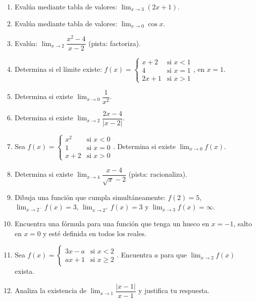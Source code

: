 \documentclass[12pt, letterpaper]{article}
\begin{document}
\begin{enumerate}[series=ejercicios, leftmargin=*]
  \item \facil{} Evalúa mediante tabla de valores: $\lim_{x \to 3} (2x + 1)$.

  \item \facil{} Evalúa mediante tabla de valores: $\lim_{x \to 0} \cos x$.

  \item \facil{} Evalúa: $\lim_{x \to 2} \dfrac{x^2 - 4}{x - 2}$ (pista: factoriza).

  \item \facil{} Determina si el límite existe: $f(x) = \begin{cases} x + 2 & \text{si } x < 1 \\ 4 & \text{si } x = 1 \\ 2x + 1 & \text{si } x > 1 \end{cases}$, en $x = 1$.

  \item \medio{} Determina si existe $\lim_{x \to 0} \dfrac{1}{x^2}$.

  \item \medio{} Determina si existe $\lim_{x \to 2} \dfrac{2x - 4}{|x - 2|}$.

  \item \medio{} Sea $f(x) = \begin{cases} x^2 & \text{si } x < 0 \\ 1 & \text{si } x = 0 \\ x + 2 & \text{si } x > 0 \end{cases}$. Determina si existe $\lim_{x \to 0} f(x)$.

  \item \medio{} Determina si existe $\lim_{x \to 4} \dfrac{x - 4}{\sqrt{x} - 2}$ (pista: racionaliza).

  \item \dificil{} Dibuja una función que cumpla simultáneamente: $f(2) = 5$, $\lim_{x \to 2^-} f(x) = 3$, $\lim_{x \to 2^+} f(x) = 3$ y $\lim_{x \to 3} f(x) = \infty$.

  \item \dificil{} Encuentra una fórmula para una función que tenga un hueco en $x = -1$, salto en $x = 0$ y esté definida en todos los reales.

  \item \dificil{} Sea $f(x) = \begin{cases} 3x - a & \text{si } x < 2 \\ ax + 1 & \text{si } x \ge 2 \end{cases}$. Encuentra $a$ para que $\lim_{x \to 2} f(x)$ exista.

  \item \dificil{} Analiza la existencia de $\lim_{x \to 1} \dfrac{|x - 1|}{x - 1}$ y justifica tu respuesta.
\end{enumerate}
\end{document}
